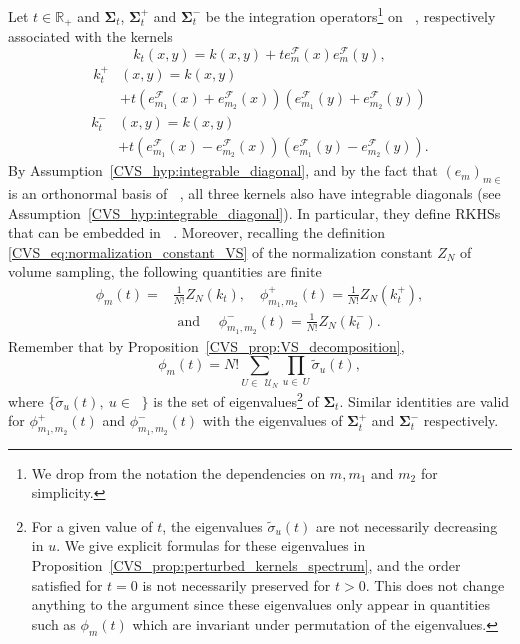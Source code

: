 \documentclass[twoside,11pt]{book}
\numberwithin{theorem}{chapter}
\numberwithin{definition}{chapter}
\numberwithin{proposition}{chapter}
\numberwithin{corollary}{chapter}
\numberwithin{example}{chapter}
\numberwithin{lemma}{chapter}
\numberwithin{assumption}{chapter}
\DeclareMathOperator{\F}{\mathcal{F}}
\DeclareMathOperator{\X}{\mathcal{X}}
\DeclareMathOperator{\Ltwo}{\mathbb{L}_{2}(\mathrm{d} \omega)}
\DeclareMathOperator{\Ns}{\mathbb{N}^{*}}
\def\UN{\:\mathcal{U}_N}
\begin{document}
Let $t\in\mathbb{R}_{+}$ and $\bm{\Sigma}_{t}$, $\bm{\Sigma}_{t}^{+}$ and $\bm{\Sigma}_{t}^{-}$ be the integration operators\footnote{We drop from the notation the dependencies on $m,m_{1}$ and $m_{2}$ for simplicity.} on $\Ltwo$, respectively associated with the kernels
\begin{equation}\label{CVS_eq:k_t}
k_{t}(x,y) = k(x,y) + t e_{m}^{\F}(x) e_{m}^{\F}(y),
\end{equation}
\begin{align}\label{CVS_eq:k_t_plus}
k_{t}^{+}&(x,y) = k(x,y)  \\
& + t \left( e_{m_{1}}^{\F}(x) + e_{m_{2}}^{\F}(x) \right) \left( e_{m_{1}}^{\F}(y) + e_{m_{2}}^{\F}(y) \right)\nonumber
\end{align}
\begin{align}\label{CVS_eq:k_t_minus}
k_{t}^{-}&(x,y) = k(x,y)\\
& + t \left( e_{m_{1}}^{\F}(x) - e_{m_{2}}^{\F}(x) \right) \left( e_{m_{1}}^{\F}(y) - e_{m_{2}}^{\F}(y) \right) \nonumber.
\end{align}
By Assumption~\ref{CVS_hyp:integrable_diagonal}, and by the fact that $(e_{m})_{m \in \Ns}$ is an orthonormal basis of $\Ltwo$, all three kernels also have integrable diagonals (see Assumption~\ref{CVS_hyp:integrable_diagonal}).
In particular, they define RKHSs that can be embedded in $\Ltwo$. Moreover, recalling the definition \eqref{CVS_eq:normalization_constant_VS} of the normalization constant $Z_{N}$ of volume sampling, the following quantities are finite
\begin{align}
\phi_{m}(t) = & \frac{1}{N!} Z_{N}(k_{t}) , \quad\phi_{m_{1},m_{2}}^{+}(t) = \frac{1}{N!} Z_{N}(k_{t}^{+}),\nonumber\\  &\text{ and }\quad \phi_{m_{1},m_{2}}^{-}(t) = \frac{1}{N!} Z_{N}(k_{t}^{-}).
\end{align}
Remember that by Proposition~\ref{CVS_prop:VS_decomposition},
\begin{equation}\label{CVS_eq:Z_kt}
\phi_{m}(t) = N! \sum\limits_{U \in \: \UN} \prod\limits_{u \in \: U} \tilde{\sigma}_{u}(t),
\end{equation}
where $\displaystyle \{\tilde{\sigma}_{u}(t), \: u \in \Ns\}$ is the set of eigenvalues\footnote{For a given value of $t$, the eigenvalues $\tilde{\sigma}_{u}(t)$ are not necessarily decreasing in $u$. We give explicit formulas for these eigenvalues in Proposition~\ref{CVS_prop:perturbed_kernels_spectrum}, and the order satisfied for $t=0$ is not necessarily preserved for $t>0$. This does not change anything to the argument since these eigenvalues only appear in quantities such as $\phi_{m}(t)$ which are invariant under permutation of the eigenvalues.} of $\bm{\Sigma}_{t}$. Similar identities are valid for $\phi_{m_{1},m_{2}}^{+}(t)$ and $\phi_{m_{1},m_{2}}^{-}(t)$ with the eigenvalues of $\bm{\Sigma}_{t}^{+}$ and $\bm{\Sigma}_{t}^{-}$ respectively.
\end{document}
